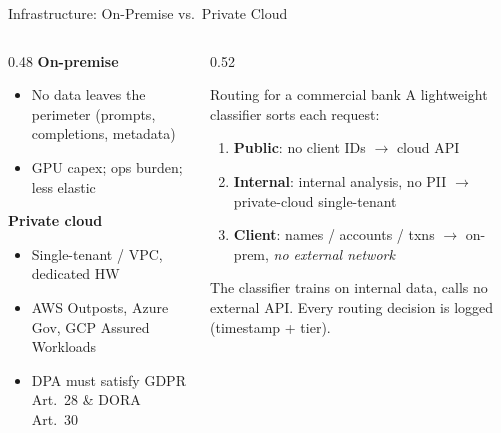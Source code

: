 \documentclass[9pt,t]{beamer}
\begin{document}
\begin{frame}{Infrastructure: On-Premise vs.\ Private Cloud}
\begin{columns}[T]
\begin{column}{0.48\textwidth}
\textbf{On-premise}
\begin{itemize}
  \item[+] No data leaves the perimeter (prompts, completions, metadata)
  \item[--] GPU capex; ops burden; less elastic
\end{itemize}
\medskip
\textbf{Private cloud}
\begin{itemize}
  \item Single-tenant / VPC, dedicated HW
  \item AWS Outposts, Azure Gov, GCP Assured Workloads
  \item[!] DPA must satisfy GDPR Art.\ 28 \& DORA Art.\ 30
\end{itemize}
\end{column}
\begin{column}{0.52\textwidth}
\begin{exampleblock}{Routing for a commercial bank}
A lightweight classifier sorts each request:
\begin{enumerate}
  \item \textbf{Public}: no client IDs $\to$ cloud API
  \item \textbf{Internal}: internal analysis, no PII $\to$ private-cloud single-tenant
  \item \textbf{Client}: names / accounts / txns $\to$ on-prem, \emph{no external network}
\end{enumerate}
The classifier trains on internal data, calls no external API. Every routing
decision is logged (timestamp + tier).
\end{exampleblock}
\end{column}
\end{columns}
\end{frame}
\end{document}
